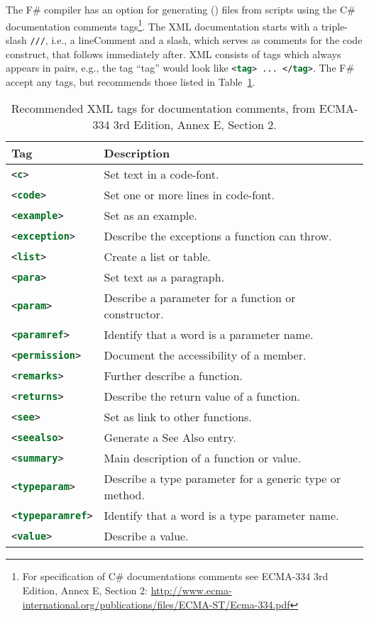 The F\# compiler has an option for generating  () files from scripts using the C\# documentation comments tags\footnote{For specification of C\# documentations comments see ECMA-334 3rd Edition, Annex E, Section 2: \url{http://www.ecma-international.org/publications/files/ECMA-ST/Ecma-334.pdf}}. The XML documentation starts with a triple-slash \lstinline{///}, i.e., a lineComment and a slash, which serves as comments for the code construct, that follows immediately after. XML consists of tags which always appears in pairs, e.g., the tag ``tag'' would look like \lstinline[language=xml]!<tag> ... </tag>!. The F\# accept any tags, but recommends those listed in Table~\ref{tab:xmlTags}.
\begin{table}
  \centering
  \begin{tabularx}{\linewidth}{|l|X|}
       \hline
    Tag & Description\\
    \hline
    \lstinline[language=xml]!<c>! &Set text in a code-font.\\
    \hline
    \lstinline[language=xml]!<code>! &Set one or more lines in code-font.\\
    \hline
    \lstinline[language=xml]!<example>! &Set as an example.\\
    \hline
    \lstinline[language=xml]!<exception>! &Describe the exceptions a function can throw.\\
    \hline
    \lstinline[language=xml]!<list>! &Create a list or table.\\
    \hline
    \lstinline[language=xml]!<para>! &Set text as a paragraph.\\
    \hline
    \lstinline[language=xml]!<param>! &Describe a parameter for a function or constructor.\\
    \hline
    \lstinline[language=xml]!<paramref>! &Identify that a word is a parameter name.\\
    \hline
    \lstinline[language=xml]!<permission>! &Document the accessibility of a member.\\
    \hline
    \lstinline[language=xml]!<remarks>! &Further describe a function.\\
    \hline
    \lstinline[language=xml]!<returns>! &Describe the return value of a function.\\
    \hline
    \lstinline[language=xml]!<see>! &Set as link to other functions.\\
    \hline
    \lstinline[language=xml]!<seealso>! &Generate a See Also entry.\\
    \hline
    \lstinline[language=xml]!<summary>! &Main description of a function or value.\\
    \hline
    \lstinline[language=xml]!<typeparam>! &Describe a type parameter for a generic type or method.\\
    \hline
    \lstinline[language=xml]!<typeparamref>! &Identify that a word is a type parameter name.\\
    \hline
    \lstinline[language=xml]!<value>! &Describe a value.\\
    \hline
  \end{tabularx}
  \caption{Recommended XML tags for documentation comments, from ECMA-334 3rd Edition, Annex E, Section 2.}
  \label{tab:xmlTags}
\end{table}
